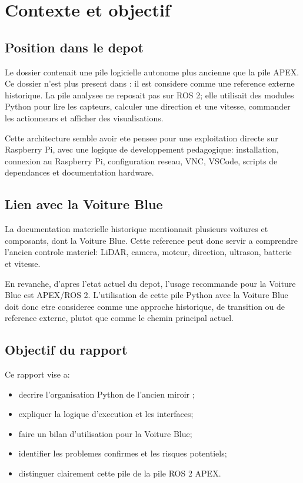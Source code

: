 \section{Contexte et objectif}

\subsection{Position dans le depot}

Le dossier  contenait une pile logicielle autonome plus ancienne que la pile APEX. Ce dossier n'est plus present dans : il est considere comme une reference externe historique. La pile analysee ne reposait pas sur ROS 2; elle utilisait des modules Python pour lire les capteurs, calculer une direction et une vitesse, commander les actionneurs et afficher des visualisations.

Cette architecture semble avoir ete pensee pour une exploitation directe sur Raspberry Pi, avec une logique de developpement pedagogique: installation, connexion au Raspberry Pi, configuration reseau, VNC, VSCode, scripts de dependances et documentation hardware.

\subsection{Lien avec la Voiture Blue}

La documentation materielle historique mentionnait plusieurs voitures et composants, dont la Voiture Blue. Cette reference peut donc servir a comprendre l'ancien controle materiel: LiDAR, camera, moteur, direction, ultrason, batterie et vitesse.

En revanche, d'apres l'etat actuel du depot, l'usage recommande pour la Voiture Blue est APEX/ROS 2. L'utilisation de cette pile Python avec la Voiture Blue doit donc etre consideree comme une approche historique, de transition ou de reference externe, plutot que comme le chemin principal actuel.

\subsection{Objectif du rapport}

Ce rapport vise a:

\begin{itemize}
  \item decrire l'organisation Python de l'ancien miroir ;
  \item expliquer la logique d'execution et les interfaces;
  \item faire un bilan d'utilisation pour la Voiture Blue;
  \item identifier les problemes confirmes et les risques potentiels;
  \item distinguer clairement cette pile de la pile ROS 2 APEX.
\end{itemize}
